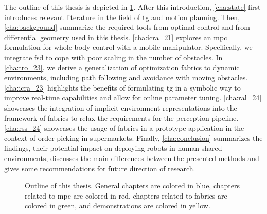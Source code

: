 The outline of this thesis is depicted in \cref{fig:outline}.
After this introduction, \cref{cha:state} first introduces
relevant literature in the field of \ac{tg}
and motion planning.
Then, \cref{cha:background} summarize the required tools
from optimal control and from differential geometry used in this thesis.
\cref{cha:icra_21} explores an \ac{mpc}
formulation for whole body control
with a mobile manipulator. Specifically, we integrate
\ac{fsd} to cope with poor scaling in the number of
obstacles.
In \cref{cha:tro_23}, we derive a
generalization of optimization fabrics to dynamic
environments, including path following and avoidance with
moving obstacles.
\cref{cha:icra_23} highlights the benefits of
formulating \ac{tg} in a symbolic way to
improve real-time capabilities and allow for online
parameter tuning.
\cref{cha:ral_24} showcases the integration of
implicit environment representations into the framework of
\ac{fabrics} to relax the requirements for the
perception pipeline.
\cref{cha:rss_24} showcases the 
usage of \ac{fabrics} in a prototype application in the
context of order-picking in supermarkets.
Finally,
\cref{cha:conclusion} summarizes the findings, their potential impact
on deploying robots in human-shared environments, discusses
the main differences between the presented methods and gives some
recommendations for future direction of research.
%
\begin{figure}[ht]
  \begin{center}
    
  \end{center}
  \caption{Outline of this thesis. General chapters are
  colored in blue, chapters related to \ac{mpc} are colored
  in red, chapters related to \ac{fabrics} are colored in 
  green, and demonstrations are colored in yellow.}
  \label{fig:outline}
\end{figure}
%


